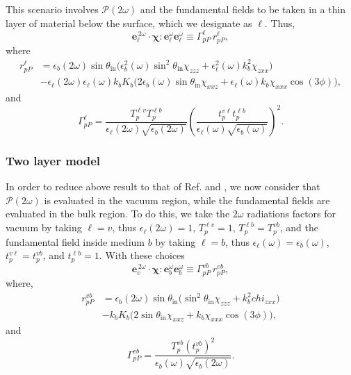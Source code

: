 \documentclass[10pt]{article}
\begin{document}
This scenario involves $\mathcal{P}(2\omega)$ and the fundamental fields to be
taken in a thin layer of material below the surface, which we designate as
$\ell$. Thus,
\begin{equation*}\label{m80}
\mathbf{e}^{\,2\omega}_{\ell}\cdot\boldsymbol{\chi}:
\mathbf{e}^\omega_{\ell}\mathbf{e}^\omega_{\ell}
\equiv\Gamma^{\ell}_{pP}\,r^{\ell}_{pP}
,
\end{equation*}
where
\begin{align}\label{m81}
r^{\ell}_{pP} &=
\epsilon_{b}(2\omega)\sin\theta_{\mathrm{in}}
\Big(
  \epsilon^2_{b}(\omega)\sin^2\theta_{\mathrm{in}}\chi_{zzz}
+ \epsilon^2_{\ell}(\omega)k^2_{b}\chi_{zxx}
\Big)\\
&- \epsilon_{\ell}(2\omega)\epsilon_{\ell}(\omega)k_{b}K_{b}
\Big(
  2\epsilon_{b}(\omega)\sin\theta_{\mathrm{in}}\chi_{xxz}
+ \epsilon_{\ell}(\omega)k_{b}\chi_{xxx}\cos(3\phi) 
\Big),\nonumber
\end{align}
and  
\begin{equation}\label{m79}
\Gamma^{\ell}_{pP}=
\frac{T_{p}^{\ell v}T^{\ell b}_{p}}
     {\epsilon_{\ell}(2\omega)\sqrt{\epsilon_{b}(2\omega)}}
\left(
\frac{t_{p}^{v\ell}t^{\ell b}_{p}}
     {\epsilon_{\ell}(\omega)\sqrt{\epsilon_{b}(\omega)}}
\right)^{2} 
.  
\end{equation}


\subsubsection{Two layer model}

In order to reduce above result to that of Ref. \cite{mizrahiJOSA88} and
\cite{sipePRB87}, we now consider that $\mathcal{P}(2\omega)$ is evaluated in
the vacuum region, while the fundamental fields are evaluated in the bulk
region. To do this, we take the $2\omega$ radiations factors for vacuum by
taking $\ell=v$, thus $\epsilon_{\ell}(2\omega)=1$, $T^{\ell v}_{p}=1$, $T^{\ell
b}_{p}=T^{vb}_{p}$, and the fundamental field inside medium $b$ by taking
$\ell=b$, thus $\epsilon_{\ell}(\omega)=\epsilon_{b}(\omega)$,
$t^{v\ell}_{p}=t^{vb}_{p}$, and $t^{\ell b}_{p}=1$. With these choices
\begin{equation*}\label{m800}
\mathbf{e}^{\,2\omega}_{v}\cdot\boldsymbol{\chi}:
\mathbf{e}^\omega_{b}\mathbf{e}^\omega_{b}
\equiv\Gamma^{vb}_{pP}\,r^{vb}_{pP}
,
\end{equation*}
where,
\begin{equation*}\label{m82}
\begin{split}
r^{vb}_{pP}
&= \epsilon_{b}(2\omega)\sin\theta_{\mathrm{in}}
\Big(
\sin^2\theta_{\mathrm{in}}\chi_{zzz} + k^{2}_{b}chi_{zxx}
\Big)\\
&- k_{b}K_{b}
\Big(
2\sin\theta_{\mathrm{in}}\chi_{xxz} + k_{b}\chi_{xxx}\cos(3\phi) 
\Big) 
,
\end{split}
\end{equation*}
and 
\begin{equation*}\label{m78}
\Gamma^{vb}_{pP}
= \frac{T^{v b}_{p}(t^{vb}_{p})^2}
       {\epsilon_{b}(\omega)\sqrt{\epsilon_{b}(2\omega)}}.
\end{equation*}
\end{document}

